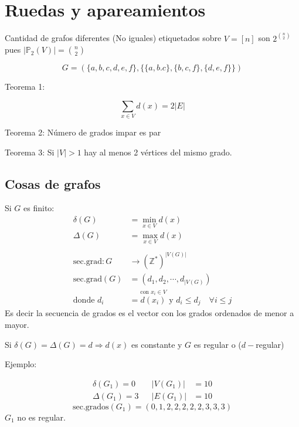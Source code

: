 \documentclass[../main.tex]{subfiles}
\begin{document}
\chapter{Ruedas y apareamientos}%

\thispagestyle{fancy}

Cantidad de grafos diferentes (No iguales) etiquetados sobre
$V=[n]$ son $2^\binom{n}{2}$ pues $|\mathbb{P}_2(V)|=\binom{n}{2}$

\begin{figure}[H]
	\centering
	
\end{figure}

\[
	G=
	(
		\{a,b,c,d,e,f\},
		\{
			\{a,b.c\},
			\{b,c,f\},
			\{d,e,f\}
		\}
	)
\]

Teorema 1:

\[
	\sum_{x\in V}
	d(x)=2|E|
\]

Teorema 2:
Número de grados impar es par

Teorema 3:
Si $|V|>1$ hay al menos 2 vértices del mismo grado.

\section{Cosas de grafos}%
\label{sec:cosas_de_grafos}

Si $G$ es finito:
\begin{align*}
	\delta(G)&=\min_{x\in V}d(x)\\
	\Delta(G)&=\max_{x\in V}d(x)\\
	\\
	\text{sec.grad}:G&\longrightarrow (\mathbb{Z}^*)^{|V(G)|}\\
	\text{sec.grad}(G)&=
	(d_1,d_2,\cdots,d_{|V(G)})\\
	\text{donde }d_i&=
	\overset
	{
		\text{con $x_i\in V$}
	}
	{
		d(x_i)
	}
	\text{  y  }
	d_i \leq d_j \quad\forall i \leq j
\end{align*}
Es decir la secuencia de grados es el vector con los grados ordenados de menor
a mayor.

Si $\delta(G)=\Delta(G)=d\Longrightarrow d(x)$ es constante y $G$ es regular
o ($d-$regular)

Ejemplo:

\begin{figure}[H]
	\centering
	
\end{figure}

\begin{align*}
	\delta(G_1)=0 && |V(G_1)| &= 10\\
	\Delta(G_1)=3 && |E(G_1)| &= 10
\end{align*}
\[
	\text{sec.grados}(G_1)=(0,1,2,2,2,2,2,3,3,3)
\]
$G_1$ no es regular.
\end{document}
